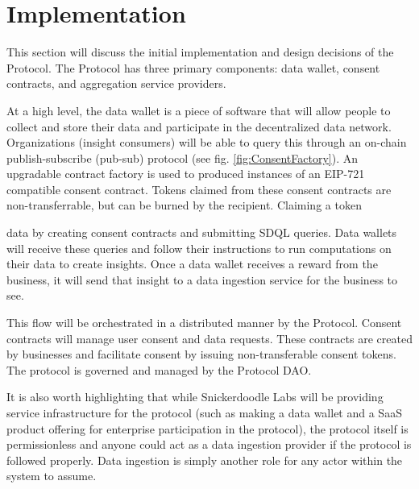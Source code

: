 \section{Implementation}
\label{section:Implementation}



This section will discuss the initial implementation and design decisions of the Protocol. The Protocol has three primary 
components: data wallet, consent contracts, and aggregation service providers.



At a high level, the data wallet is a piece of software that will allow people to collect and store their data and participate 
in the decentralized data network. Organizations (insight consumers) will be able to query this through an on-chain publish-subscribe (pub-sub)
protocol (see fig. \ref{fig:ConsentFactory}). An upgradable contract factory is used to produced instances of an EIP-721 compatible consent contract.
Tokens claimed from these consent contracts are non-transferrable, but can be burned by the recipient. Claiming a token

data by creating consent contracts and submitting SDQL queries. 
Data wallets will receive these queries and follow their instructions to run computations on their data to create insights. Once a 
data wallet receives a reward from the business, it will send that insight to a data ingestion service for the business to see. 



This flow will be orchestrated in a distributed manner by the Protocol. Consent contracts will manage user consent 
and data requests. These contracts are created by businesses and facilitate consent by issuing non-transferable consent tokens. 
The protocol is governed and managed by the Protocol DAO. 

It is also worth highlighting that while Snickerdoodle Labs will be providing service infrastructure for the protocol (such as 
making a data wallet and a SaaS product offering for enterprise participation in the protocol), the protocol itself is 
permissionless and anyone could act as a data ingestion provider if the protocol is followed properly. Data ingestion is 
simply another role for any actor within the system to assume.

